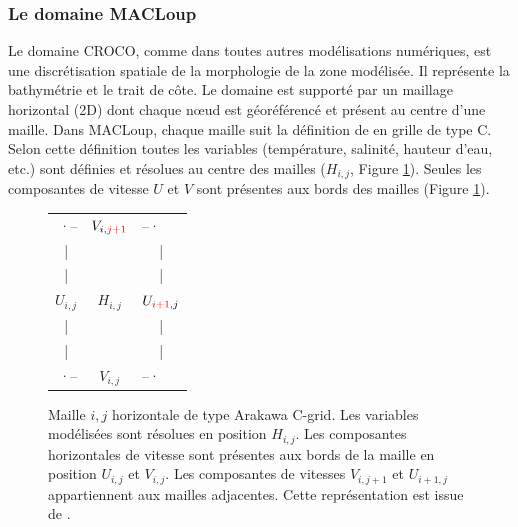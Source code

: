 \documentclass[10pt,a4paper,titlepage]{article}
\begin{document}
\subsubsection{Le domaine MACLoup}
\label{subsub:grille_croco}
Le domaine CROCO, comme dans toutes autres modélisations numériques, est une discrétisation spatiale de la morphologie de la zone modélisée.
Il représente la bathymétrie et le trait de côte.
Le domaine est supporté par un maillage horizontal (2D) dont chaque n\oe{}ud est géoréférencé et présent au centre d'une maille.
Dans MACLoup, chaque maille suit la définition de \cite{Arakawa_C-grid_1977} en grille de type C.
Selon cette définition toutes les variables (température, salinité, hauteur d'eau, etc.) sont définies et résolues au centre des mailles ($H_{i,j}$, Figure \ref{fig:structure_maille horizontale}).
Seules les composantes de vitesse $U$ et $V$ sont présentes aux bords des mailles (Figure \ref{fig:structure_maille horizontale}).
\begin{figure}[h!]
    \centering
    \begin{tabular}{ c c c }
        \multicolumn{1}{r}{·--} & $V_{i,{\color{red}j+1}}$ & \multicolumn{1}{l}{--·} \\ 
        | & & | \\
        | & & | \\
        $U_{i,j}$ & $H_{i,j}$ & $U_{{\color{red}i+1},j}$ \\  
        | & & | \\
        | & & | \\
        \multicolumn{1}{r}{·--} & \textbf{$V_{i,j}$} & \multicolumn{1}{l}{--·}
    \end{tabular}
    \caption{
        Maille $i,j$ horizontale de type Arakawa C-grid.
        Les variables modélisées sont résolues en position $H_{i,j}$.
        Les composantes horizontales de vitesse sont présentes aux bords de la maille en position $U_{i,j}$ et $V_{i,j}$.
        Les composantes de vitesses $V_{i,j+1}$ et $U_{i+1,j}$ appartiennent aux mailles adjacentes.
        Cette représentation est issue de \cite{grid_doc}.
    }
    \label{fig:structure_maille horizontale}
\end{figure}
\end{document}
